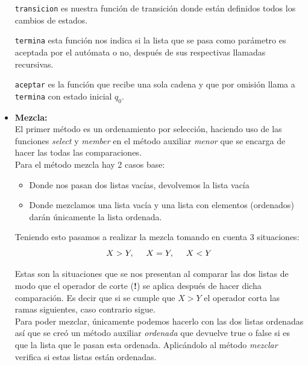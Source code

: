 \documentclass{article}
\newcommand{\code}[1]{\textcolor{white!25!black}{\texttt{#1}}}
\begin{document}
\begin{itemize}
  \code{transicion} es nuestra función de transición donde están definidos todos los cambios de estados.

  \code{termina} esta función nos indica si la lista que se pasa como parámetro es aceptada por el autómata o no,
  después de sus respectivas llamadas recursivas.

  \code{aceptar} es la función que recibe una sola cadena y que por omisión llama a \code{termina} con estado
  inicial $q_0$.
\item \textbf{Mezcla:}\\
  El primer método es un ordenamiento por selección, haciendo uso de las funciones \textit{select} y \textit{member} en el método auxiliar \textit{menor} que se encarga de hacer las todas las comparaciones.\\
  
  Para el método mezcla hay 2 casos base:
  \begin{itemize}
  \item Donde nos pasan dos listas vacías, devolvemos la lista vacía
  \item Donde mezclamos una lista vacía y una lista con elementos (ordenados) darán únicamente la lista ordenada. 
  \end{itemize}
  
  Teniendo esto pasamos a realizar la mezcla tomando en cuenta 3 situaciones:
  \begin{equation*}
    X>Y, \hspace{5mm} X=Y, \hspace{5mm} X<Y
  \end{equation*}
  
  Estas son la situaciones que se nos presentan al comparar las dos listas de modo que el operador de corte (\textbf{!}) se aplica después de hacer dicha comparación. Es decir que si se cumple que $X>Y$ el operador corta las ramas siguientes, caso contrario sigue. \\
  Para poder mezclar, únicamente podemos hacerlo con las dos listas ordenadas así que se creó un método auxiliar \textit{ordenada} que devuelve true o false si es que la lista que le pasan esta ordenada. Aplicándolo al método \textit{mezclar} verifica si estas listas están ordenadas. 
\end{itemize}
\begin{center}
\end{center}
\end{document}
